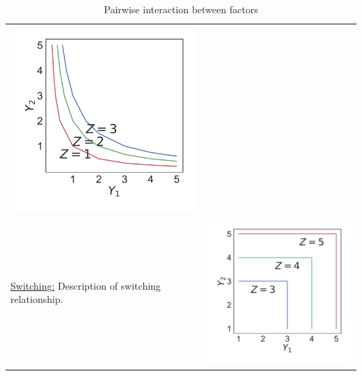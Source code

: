 \begin{table}[h!]
\begin{tabular}{m{} c}
\begin{minipage}{.175\textwidth}
      \includegraphics[width=.975\textwidth, height=.975\textwidth]{Figures/Interactive_Essential.pdf}
    \end{minipage}
    \\
    \uline{Switching:} Description of switching relationship.
    &
    \begin{minipage}{.175\textwidth}
      \includegraphics[width=.975\textwidth, height=.975\textwidth]{Figures/Switching.pdf}
    \end{minipage}
    \\
    \hline
  \end{tabular}
  \caption{Pairwise interaction between factors}
  \label{tab:interaction}
\end{table}

